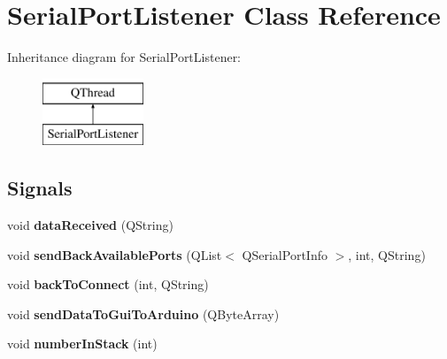 \hypertarget{class_serial_port_listener}{}\section{Serial\+Port\+Listener Class Reference}
\label{class_serial_port_listener}
Inheritance diagram for Serial\+Port\+Listener\+:\begin{figure}[H]
\begin{center}
\leavevmode
\includegraphics[height=2.000000cm]{class_serial_port_listener}
\end{center}
\end{figure}
\subsection*{Signals}
\begin{DoxyCompactItemize}
\item 
void {\bfseries data\+Received} (Q\+String)\hypertarget{class_serial_port_listener_abf1c6e95862b2d25ec0285ef77a110e9}{}\label{class_serial_port_listener_abf1c6e95862b2d25ec0285ef77a110e9}

\item 
void {\bfseries send\+Back\+Available\+Ports} (Q\+List$<$ Q\+Serial\+Port\+Info $>$, int, Q\+String)\hypertarget{class_serial_port_listener_af620ff4906c8d7653bfbd53f031896b0}{}\label{class_serial_port_listener_af620ff4906c8d7653bfbd53f031896b0}

\item 
void {\bfseries back\+To\+Connect} (int, Q\+String)\hypertarget{class_serial_port_listener_a56b44b15117baeb47509d4c0278b100e}{}\label{class_serial_port_listener_a56b44b15117baeb47509d4c0278b100e}

\item 
void {\bfseries send\+Data\+To\+Gui\+To\+Arduino} (Q\+Byte\+Array)\hypertarget{class_serial_port_listener_acc6726041672d27655578769d562acf6}{}\label{class_serial_port_listener_acc6726041672d27655578769d562acf6}

\item 
void {\bfseries number\+In\+Stack} (int)\hypertarget{class_serial_port_listener_ac5c1804cfaef3488a710044eabfbf089}{}\label{class_serial_port_listener_ac5c1804cfaef3488a710044eabfbf089}

\end{DoxyCompactItemize}
